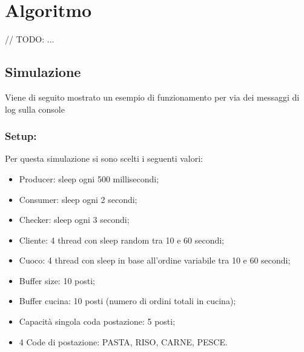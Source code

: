 \section{Algoritmo}

// TODO: ...

\subsection{Simulazione}
Viene di seguito mostrato un esempio di funzionamento per via dei messaggi di log sulla console
\subsubsection{Setup:}
Per questa simulazione si sono scelti i seguenti valori:
\begin{itemize}
	\item Producer: sleep ogni 500 millisecondi;
	\item Consumer: sleep ogni 2 secondi;
	\item Checker: sleep ogni 3 secondi;
	\item Cliente: 4 thread con sleep random tra 10 e 60 secondi;
	\item Cuoco: 4 thread con sleep in base all'ordine variabile tra 10 e 60 secondi;
	\item Buffer size: 10 posti;
	\item Buffer cucina: 10 posti (numero di ordini totali in cucina);
	\item Capacità singola coda postazione: 5 posti;
	\item 4 Code di postazione: PASTA, RISO, CARNE, PESCE.
\end{itemize}
